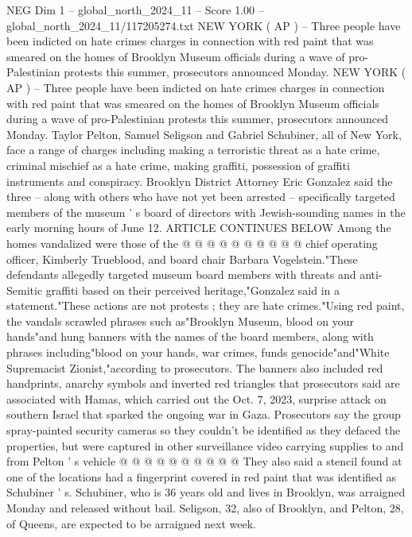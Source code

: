 \begin{textsample}{NEG Dim 1 – global\_north\_2024\_11 – Score 1.00 – global\_north\_2024\_11/117205274.txt}  \label{ex:f1_neg_223}
NEW YORK ( AP ) -- Three people have been indicted on hate crimes charges in connection with red paint that was smeared on the homes of Brooklyn Museum officials during a wave of pro-Palestinian protests this summer, prosecutors announced Monday.
NEW YORK ( AP ) -- Three people have been indicted on hate crimes charges in connection with red paint that was smeared on the homes of Brooklyn Museum officials during a wave of pro-Palestinian protests this summer, prosecutors announced Monday.
Taylor Pelton, Samuel Seligson and Gabriel Schubiner, all of New York, face a range of charges including making a terroristic threat as a hate crime, criminal mischief as a hate crime, making graffiti, possession of graffiti instruments and conspiracy.
Brooklyn District Attorney Eric Gonzalez said the three -- along with others who have not yet been arrested -- specifically targeted members of the museum ' s board of directors with Jewish-sounding names in the early morning hours of June 12.
ARTICLE CONTINUES BELOW Among the homes vandalized were those of the @ @ @ @ @ @ @ @ @ @ chief operating officer, Kimberly Trueblood, and board chair Barbara Vogelstein."These defendants allegedly targeted museum board members with threats and anti-Semitic graffiti based on their perceived heritage,"Gonzalez said in a statement."These actions are not protests ; they are hate crimes."Using red paint, the vandals scrawled phrases such as"Brooklyn Museum, blood on your hands"and hung banners with the names of the board members, along with phrases including"blood on your hands, war crimes, funds genocide"and"White Supremacist Zionist,"according to prosecutors.
The banners also included red handprints, anarchy symbols and inverted red triangles that prosecutors said are associated with Hamas, which carried out the Oct. 7, 2023, surprise attack on southern Israel that sparked the ongoing war in Gaza.
Prosecutors say the group spray-painted security cameras so they couldn't be identified as they defaced the properties, but were captured in other surveillance video carrying supplies to and from Pelton ' s vehicle @ @ @ @ @ @ @ @ @ @ They also said a stencil found at one of the locations had a fingerprint covered in red paint that was identified as Schubiner ' s.
Schubiner, who is 36 years old and lives in Brooklyn, was arraigned Monday and released without bail.
Seligson, 32, also of Brooklyn, and Pelton, 28, of Queens, are expected to be arraigned next week.

\end{textsample}
